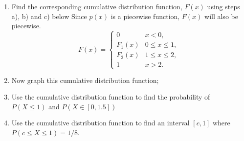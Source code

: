 \documentclass[10pt]{article}
\begin{document}
\begin{enumerate}
    \item  Find the corresponding cumulative distribution function, $F(x)$ using steps a), b) and c) below Since $p(x)$ is a piecewise function, $F(x)$ will also be piecewise.
   \[
F(x) =
\begin{cases}
0 & x < 0, \\[6pt]
F_1(x) & 0 \le x \le 1, \\[6pt]
F_2(x) & 1 \le x \le 2, \\[6pt]
1 & x > 2.
\end{cases} 
     \]
    \item Now graph this cumulative distribution function;
    \item Use the cumulative distribution function to find the probability of $P(X \leq 1)$ and $P(X \in [0,1.5])$
    \item  Use the cumulative distribution function to find an interval $[c,1]$ where $P(c\leq X\leq 1)=1/8$.
\end{enumerate}
\end{document}
